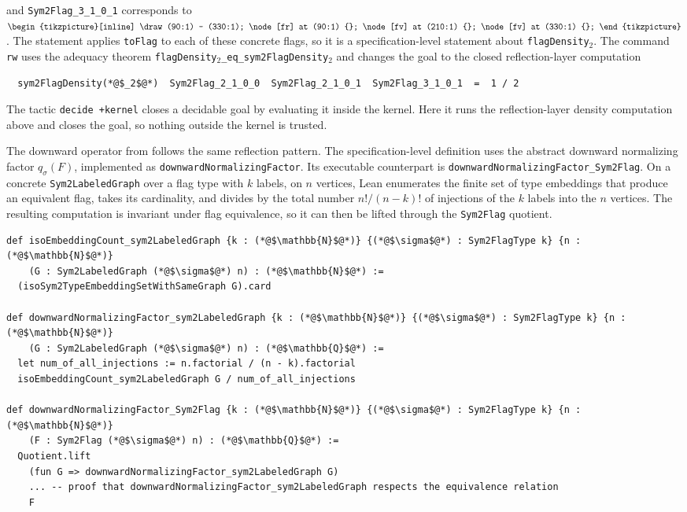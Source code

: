 \documentclass{article}
\newcommand{\lean}[1]{\texttt{#1}}
\newcommand{\fbarPthreebull}{%
  \begin{tikzpicture}[inline]
    \draw (90:1) -- (330:1);
    \node[fr] at (90:1) {};
    \node[fv] at (210:1) {};
    \node[fv] at (330:1) {};
  \end{tikzpicture}%
}
\begin{document}
and \lean{Sym2Flag\_3\_1\_0\_1} corresponds to \(\fbarPthreebull\).  The
statement applies \lean{toFlag} to each of these concrete flags, so it is a
specification-level statement about
\lean{flagDensity}$_2$.  The command \lean{rw} uses the adequacy theorem
\lean{flagDensity}$_2$\lean{\_eq\_sym2FlagDensity}$_2$ and changes the goal to
the closed reflection-layer computation
\begin{lstlisting}
  sym2FlagDensity(*@$_2$@*)  Sym2Flag_2_1_0_0  Sym2Flag_2_1_0_1  Sym2Flag_3_1_0_1  =  1 / 2
\end{lstlisting}
The tactic \lean{decide +kernel} closes a decidable goal by evaluating it
inside the kernel.  Here it runs the reflection-layer density computation above
and closes the goal, so nothing outside the kernel is trusted.

The downward operator from  follows the same
reflection pattern.  The specification-level definition uses the abstract
downward normalizing factor \(q_\sigma(F)\), implemented as
\lean{downwardNormalizingFactor}.  Its executable counterpart is
\lean{downwardNormalizingFactor\_Sym2Flag}.  On a concrete
\lean{Sym2LabeledGraph} over a flag type with \(k\) labels, on \(n\) vertices,
Lean enumerates the finite set of type embeddings that
produce an equivalent flag, takes its cardinality, and divides by the total
number \(n!/(n-k)!\) of injections of the \(k\) labels into the \(n\) vertices.
The resulting computation is invariant under flag equivalence, so it can then
be lifted through the \lean{Sym2Flag} quotient.
\begin{lstlisting}
def isoEmbeddingCount_sym2LabeledGraph {k : (*@$\mathbb{N}$@*)} {(*@$\sigma$@*) : Sym2FlagType k} {n : (*@$\mathbb{N}$@*)}
    (G : Sym2LabeledGraph (*@$\sigma$@*) n) : (*@$\mathbb{N}$@*) :=
  (isoSym2TypeEmbeddingSetWithSameGraph G).card

def downwardNormalizingFactor_sym2LabeledGraph {k : (*@$\mathbb{N}$@*)} {(*@$\sigma$@*) : Sym2FlagType k} {n : (*@$\mathbb{N}$@*)}
    (G : Sym2LabeledGraph (*@$\sigma$@*) n) : (*@$\mathbb{Q}$@*) :=
  let num_of_all_injections := n.factorial / (n - k).factorial
  isoEmbeddingCount_sym2LabeledGraph G / num_of_all_injections

def downwardNormalizingFactor_Sym2Flag {k : (*@$\mathbb{N}$@*)} {(*@$\sigma$@*) : Sym2FlagType k} {n : (*@$\mathbb{N}$@*)}
    (F : Sym2Flag (*@$\sigma$@*) n) : (*@$\mathbb{Q}$@*) :=
  Quotient.lift
    (fun G => downwardNormalizingFactor_sym2LabeledGraph G)
    ... -- proof that downwardNormalizingFactor_sym2LabeledGraph respects the equivalence relation
    F
\end{lstlisting}
\end{document}
